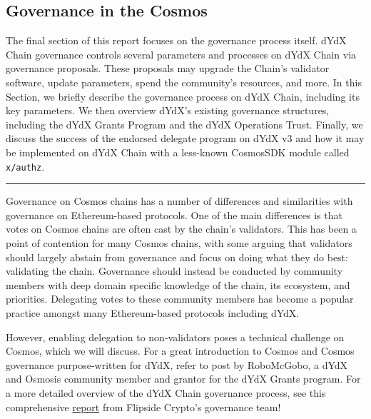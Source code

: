 \begin{fullwidth}
    \section{Governance in the Cosmos} \label{sec:governance}

    \begin{adjustwidth}{2cm}{2cm}
        \justify
        The final section of this report focuses on the governance process itself. dYdX Chain governance controls several parameters and processes on dYdX Chain via governance proposals. These proposals may upgrade the Chain's validator software, update parameters, spend the community's resources, and more. In this Section, we briefly describe the governance process on dYdX Chain, including its key parameters. We then overview dYdX's existing governance structures, including the dYdX Grants Program and the dYdX Operations Trust. Finally, we discuss the success of the endorsed delegate program on dYdX v3 and how it may be implemented on dYdX Chain with a less-known CosmosSDK module called \texttt{x/authz}.
    \end{adjustwidth}
    
    \textcolor{gray}{\rule{\linewidth}{0.1mm}}
\end{fullwidth}

    Governance on Cosmos chains has a number of differences and similarities with governance on Ethereum-based protocols. One of the main differences is that votes on Cosmos chains are often cast by the chain's validators. This has been a point of contention for many Cosmos chains, with some arguing that validators should largely abstain from governance and focus on doing what they do best: validating the chain. Governance should instead be conducted by community members with deep domain specific knowledge of the chain, its ecosystem, and priorities. Delegating votes to these community members has become a popular practice amongst many Ethereum-based protocols including dYdX. 

    However, enabling delegation to non-validators poses a technical challenge on Cosmos, which we will discuss. For a great introduction to Cosmos and Cosmos governance purpose-written for dYdX, refer to  post by RoboMcGobo, a dYdX and Osmosis community member and grantor for the dYdX Grants program. For a more detailed overview of the dYdX Chain governance process, see this comprehensive \href{https://drive.google.com/file/d/1smL9EMRItWbloTJ9u0sxiynKDVvsBH6e/view}{report} from Flipside Crypto's governance team!

